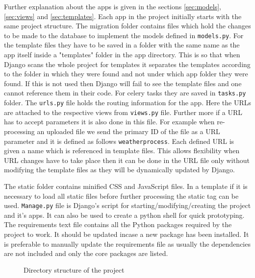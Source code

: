 Further explanation about the apps is given in the sections \ref{sec:models},
\ref{sec:views} and \ref{sec:templates}. Each app in the project initially
starts with the same project structure. The migration folder contains files
which hold the changes to be made to the database to implement the models
defined in \texttt{models.py}. For the template files they have to be saved in a
folder with the same name as the app itself inside a "templates" folder in the
app directory. This is so that when Django scans the whole project for templates
it separates the templates according to the folder in which they were found and
not under which app folder they were found. If this is not used then Django will
fail to see the template files and one cannot reference them in their code. For
celery tasks they are saved in \texttt{tasks.py} folder. The \texttt{urls.py}
file holds the routing information for the app. Here the URLs are attached to
the respective views from \texttt{views.py} file. Further more if a URL has to
accept parameters it is also done in this file. For example when re-processing
an uploaded file we send the primary ID of the file as a URL parameter and it is
defined as follows \texttt{weather\/process\/<int:id>}. Each defined URL is
given a name which is referenced in template files. This allows flexibility when
URL changes have to take place then it can be done in the URL file only without
modifying the template files as they will be dynamically updated by Django.

The static folder contains minified CSS and JavaScript files. In a template if
it is necessary to load all static files before further processing the static
tag can be used. \texttt{Manage.py} file is Django's script for
starting/modifying/creating the project and it's apps. It can also be used to
create a python shell for quick prototyping. The requirements text file contains
all the Python packages required by the project to work. It should be updated
incase a new package has been installed. It is preferable to manually update the
requirements file as usually the dependencies are not included and only the core
packages are listed.

\begin{figure}[H]
	\caption{Directory structure of the project}
	\label{fig:directory_structure}
\end{figure}

